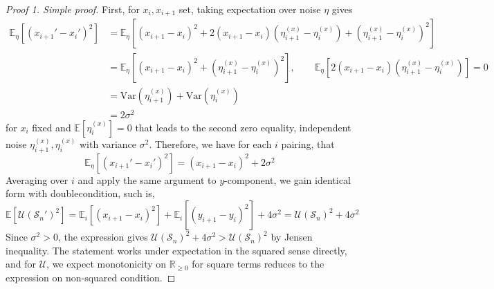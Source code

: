 \begin{proof}[Proof 1. Simple proof]
    First, for $x_{i},x_{i+1}$ set, taking expectation over noise $\eta$ gives
    \begin{equation}
        \begin{split}
            \mathbb{E}_{\eta} \left[ (x_{i+1}'-x_{i}')^{2} \right] 
            &= \mathbb{E}_{\eta} \left[ (x_{i+1}-x_{i})^{2} + 2(x_{i+1}-x_{i})(\eta_{i+1}^{(x)}-\eta_{i}^{(x)})+ (\eta_{i+1}^{(x)}-\eta_{i}^{(x)})^{2} \right] \\
            & = \mathbb{E}_{\eta} \left[ (x_{i+1}-x_{i})^{2} + (\eta_{i+1}^{(x)}-\eta_{i}^{(x)})^{2} \right], \qquad \mathbb{E}_{\eta}\left[2(x_{i+1}-x_{i})(\eta_{i+1}^{(x)}-\eta_{i}^{(x)})\right] = 0 \\
            & = \mathrm{Var}(\eta_{i+1}^{(x)}) + \mathrm{Var}(\eta_{i}^{(x)}) \\
            & = 2\sigma^{2}
        \end{split}
    \end{equation} 
    for $x_{i}$ fixed and $\mathbb{E}[\eta_{i}^{(x)}]=0$ that leads to the second zero equality, independent noise $\eta_{i+1}^{(x)},\eta_{i}^{(x)}$ with variance $\sigma^{2}$. Therefore, we have for each $i$ pairing, that
    \begin{equation}
        \mathbb{E}_{\eta} \left[ (x_{i+1}'-x_{i}')^{2} \right] = (x_{i+1}-x_{i})^{2} + 2\sigma^{2}
    \end{equation}
    Averaging over $i$ and apply the same argument to $y$-component, we gain identical form with doublecondition, such is, 
    \begin{equation}
        \mathbb{E}[\mathcal{U}(\mathcal{S}_{n}')^{2} ] = \mathbb{E}_{i}\left[ (x_{i+1}-x_{i})^{2} \right] + \mathbb{E}_{i}\left[ (y_{i+1}-y_{i})^{2} \right] + 4\sigma^{2} = \mathcal{U}(\mathcal{S}_{n})^{2} + 4\sigma^{2}
    \end{equation}
    Since $\sigma^{2}>0$, the expression gives $\mathcal{U}(\mathcal{S}_{n})^{2} + 4\sigma^{2}>\mathcal{U}(\mathcal{S}_{n})^{2}$ by Jensen inequality. The statement works under expectation in the squared sense directly, and for $\mathcal{U}$, we expect monotonicity on $\mathbb{R}_{\geq 0}$ for square terms reduces to the expression on non-squared condition.  
\end{proof}

